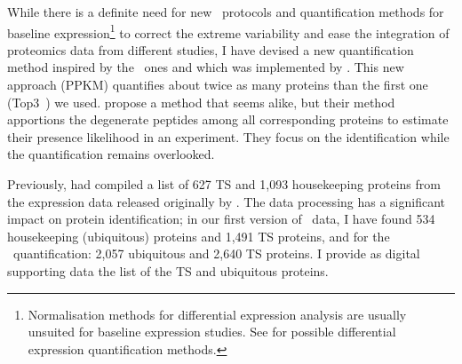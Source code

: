 While there is a definite need for new \ms\ protocols and quantification methods
for baseline expression\footnote{Normalisation methods for differential expression
analysis are usually unsuited for baseline expression studies.
See \citet{Valikangas2018-yj} for possible differential expression quantification
methods.} to correct the extreme variability
and ease the integration of proteomics data from different studies,
I have devised a new quantification method inspired by the \Rnaseq\ ones and
which was implemented by \james.
This new approach (\gls{PPKM}) quantifies
about twice as many proteins than the first one (Top3~) we used.
\citet{Nesvizhskii2003-ls} propose a method that seems alike,
but their method apportions the degenerate peptides
among all corresponding proteins to estimate their presence likelihood in an experiment.
They focus on the identification while the quantification remains overlooked.

Previously, \citet{Liu2014-xr} had compiled a list of 627 \gls{TS} and
1,093 housekeeping proteins
from the expression data released originally by \citet{PandeyData}.
The data processing has a significant impact on protein identification;
in our first version of \pandey\ data,
I have found 534 housekeeping (ubiquitous) proteins and 1,491 \gls{TS} proteins,
and for the \PPKM\ quantification: 2,057 ubiquitous and 2,640 \gls{TS} proteins.
I provide as digital supporting data the list of the \gls{TS} and
ubiquitous proteins.

